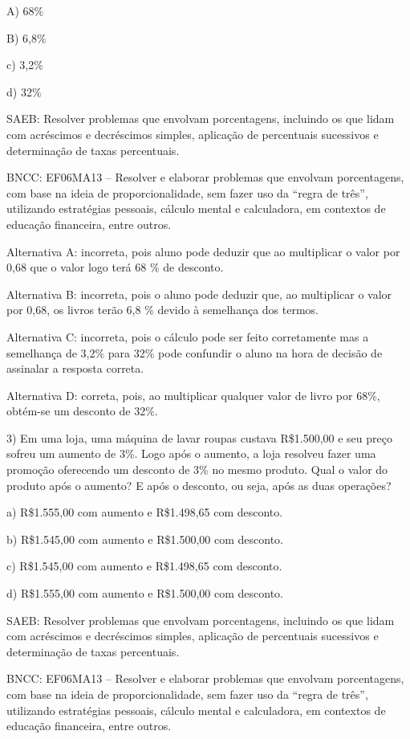 A) 68\%

B) 6,8\%

c) 3,2\%

d) 32\%

SAEB: Resolver problemas que envolvam porcentagens, incluindo os que
lidam com acréscimos e decréscimos simples, aplicação de percentuais
sucessivos e determinação de taxas percentuais.

BNCC: EF06MA13 -- Resolver e elaborar problemas que envolvam
porcentagens, com base na ideia de proporcionalidade, sem fazer uso da
``regra de três'', utilizando estratégias pessoais, cálculo mental e
calculadora, em contextos de educação financeira, entre outros.

Alternativa A: incorreta, pois aluno pode deduzir que ao multiplicar o
valor por 0,68 que o valor logo terá 68 \% de desconto.

Alternativa B: incorreta, pois o aluno pode deduzir que, ao multiplicar
o valor por 0,68, os livros terão 6,8 \% devido à semelhança dos termos.

Alternativa C: incorreta, pois o cálculo pode ser feito corretamente mas
a semelhança de 3,2\% para 32\% pode confundir o aluno na hora de
decisão de assinalar a resposta correta.

Alternativa D: correta, pois, ao multiplicar qualquer valor de livro por
68\%, obtém-se um desconto de 32\%.

3) Em uma loja, uma máquina de lavar roupas custava R\$1.500,00 e seu
preço sofreu um aumento de 3\%. Logo após o aumento, a loja resolveu
fazer uma promoção oferecendo um desconto de 3\% no mesmo produto. Qual
o valor do produto após o aumento? E após o desconto, ou seja, após as
duas operações?

a) R\$1.555,00 com aumento e R\$1.498,65 com desconto.

b) R\$1.545,00 com aumento e R\$1.500,00 com desconto.

c) R\$1.545,00 com aumento e R\$1.498,65 com desconto.

d) R\$1.555,00 com aumento e R\$1.500,00 com desconto.

SAEB: Resolver problemas que envolvam porcentagens, incluindo os que
lidam com acréscimos e decréscimos simples, aplicação de percentuais
sucessivos e determinação de taxas percentuais.

BNCC: EF06MA13 -- Resolver e elaborar problemas que envolvam
porcentagens, com base na ideia de proporcionalidade, sem fazer uso da
``regra de três'', utilizando estratégias pessoais, cálculo mental e
calculadora, em contextos de educação financeira, entre outros.


